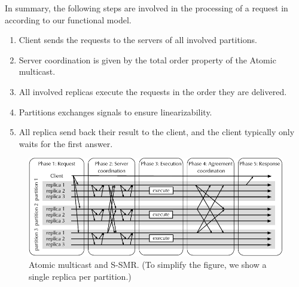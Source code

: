 In summary, the following steps are involved in the processing of a request in
\ssmr\, according to our functional model.

\begin{enumerate}
  \item Client sends the requests to the servers of all involved partitions.
  \item Server coordination is given by the total order property of the Atomic
  multicast.
  \item All involved replicas execute the requests in the order they are delivered.
  \item Partitions exchanges signals to ensure linearizability.
  \item All replica send back their result to the client, and the client
  typically only waits for the first answer.
\end{enumerate}

\begin{figure}
  \begin{minipage}[b]{1.0\linewidth}
  \centering
        \includegraphics[width=1\linewidth]{figures/coordination-ssmr}
  \end{minipage}
  \caption{Atomic multicast and S-SMR. (To simplify the figure, we show a single replica per partition.)}
  \label{fig:coordination-ssmr}
\end{figure}



